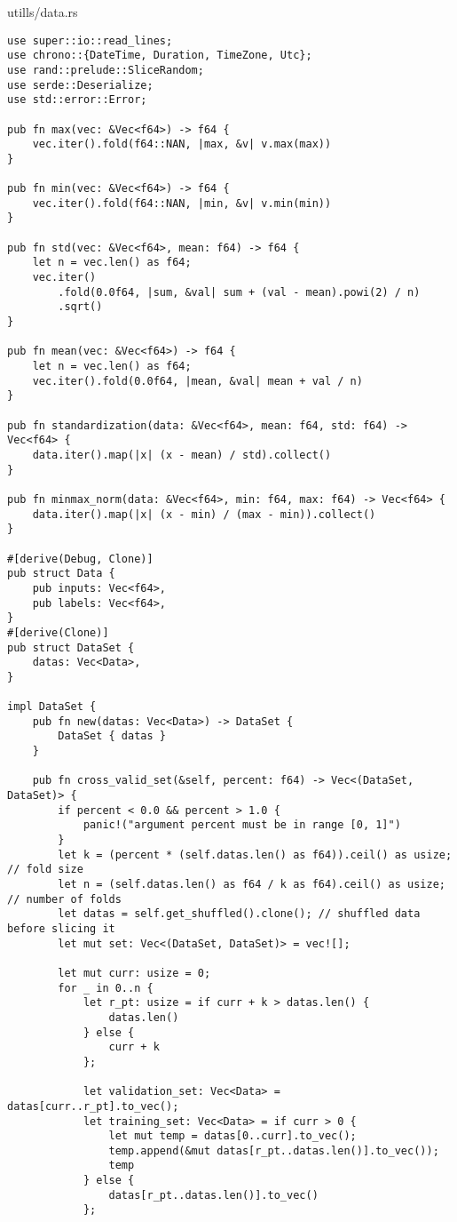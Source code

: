 \begin{code}
\caption{utills/data.rs}
\label{src:data}
\begin{verbatim}  
use super::io::read_lines;
use chrono::{DateTime, Duration, TimeZone, Utc};
use rand::prelude::SliceRandom;
use serde::Deserialize;
use std::error::Error;

pub fn max(vec: &Vec<f64>) -> f64 {
    vec.iter().fold(f64::NAN, |max, &v| v.max(max))
}

pub fn min(vec: &Vec<f64>) -> f64 {
    vec.iter().fold(f64::NAN, |min, &v| v.min(min))
}

pub fn std(vec: &Vec<f64>, mean: f64) -> f64 {
    let n = vec.len() as f64;
    vec.iter()
        .fold(0.0f64, |sum, &val| sum + (val - mean).powi(2) / n)
        .sqrt()
}

pub fn mean(vec: &Vec<f64>) -> f64 {
    let n = vec.len() as f64;
    vec.iter().fold(0.0f64, |mean, &val| mean + val / n)
}

pub fn standardization(data: &Vec<f64>, mean: f64, std: f64) -> Vec<f64> {
    data.iter().map(|x| (x - mean) / std).collect()
}

pub fn minmax_norm(data: &Vec<f64>, min: f64, max: f64) -> Vec<f64> {
    data.iter().map(|x| (x - min) / (max - min)).collect()
}

#[derive(Debug, Clone)]
pub struct Data {
    pub inputs: Vec<f64>,
    pub labels: Vec<f64>,
}
#[derive(Clone)]
pub struct DataSet {
    datas: Vec<Data>,
}

impl DataSet {
    pub fn new(datas: Vec<Data>) -> DataSet {
        DataSet { datas }
    }

    pub fn cross_valid_set(&self, percent: f64) -> Vec<(DataSet, DataSet)> {
        if percent < 0.0 && percent > 1.0 {
            panic!("argument percent must be in range [0, 1]")
        }
        let k = (percent * (self.datas.len() as f64)).ceil() as usize; // fold size
        let n = (self.datas.len() as f64 / k as f64).ceil() as usize; // number of folds
        let datas = self.get_shuffled().clone(); // shuffled data before slicing it
        let mut set: Vec<(DataSet, DataSet)> = vec![];

        let mut curr: usize = 0;
        for _ in 0..n {
            let r_pt: usize = if curr + k > datas.len() {
                datas.len()
            } else {
                curr + k
            };

            let validation_set: Vec<Data> = datas[curr..r_pt].to_vec();
            let training_set: Vec<Data> = if curr > 0 {
                let mut temp = datas[0..curr].to_vec();
                temp.append(&mut datas[r_pt..datas.len()].to_vec());
                temp
            } else {
                datas[r_pt..datas.len()].to_vec()
            };


\end{verbatim}
\end{code}
